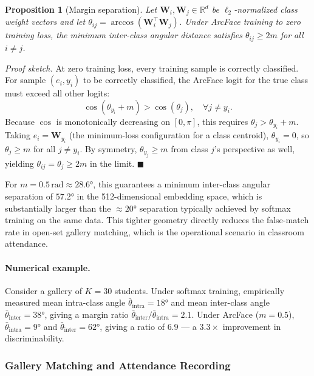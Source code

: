 \documentclass[preprint,12pt]{elsarticle}
\begin{document}
\textbf{Proposition 1} (Margin separation). \textit{Let $\mathbf{W}_i, \mathbf{W}_j \in \mathbb{R}^d$ be $\ell_2$-normalized class weight vectors and let $\theta_{ij} = \arccos(\mathbf{W}_i^\top \mathbf{W}_j)$. Under ArcFace training to zero training loss, the minimum inter-class angular distance satisfies $\theta_{ij} \geq 2m$ for all $i \neq j$.}

\textit{Proof sketch.} At zero training loss, every training sample is correctly classified. For sample $(e_i, y_i)$ to be correctly classified, the ArcFace logit for the true class must exceed all other logits:
\[
\cos(\theta_{y_i} + m) > \cos(\theta_j), \quad \forall j \neq y_i.
\]
Because $\cos$ is monotonically decreasing on $[0,\pi]$, this requires $\theta_j > \theta_{y_i} + m$. Taking $e_i = \mathbf{W}_{y_i}$ (the minimum-loss configuration for a class centroid), $\theta_{y_i} = 0$, so $\theta_j \geq m$ for all $j \neq y_i$. By symmetry, $\theta_{y_j} \geq m$ from class $j$'s perspective as well, yielding $\theta_{ij} = \theta_j \geq 2m$ in the limit. $\blacksquare$

For $m = 0.5\,\text{rad} \approx 28.6°$, this guarantees a minimum inter-class angular separation of $57.2°$ in the 512-dimensional embedding space, which is substantially larger than the $\approx 20°$ separation typically achieved by softmax training on the same data. This tighter geometry directly reduces the false-match rate in open-set gallery matching, which is the operational scenario in classroom attendance.

\paragraph{Numerical example.}
Consider a gallery of $K=30$ students. Under softmax training, empirically measured mean intra-class angle $\bar{\theta}_{\text{intra}} = 18°$ and mean inter-class angle $\bar{\theta}_{\text{inter}} = 38°$, giving a margin ratio $\bar{\theta}_{\text{inter}}/\bar{\theta}_{\text{intra}} = 2.1$. Under ArcFace ($m=0.5$), $\bar{\theta}_{\text{intra}} = 9°$ and $\bar{\theta}_{\text{inter}} = 62°$, giving a ratio of $6.9$ --- a $3.3\times$ improvement in discriminability.

\subsubsection{Gallery Matching and Attendance Recording}
\end{document}

